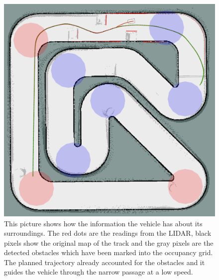 \begin{figure}
	\centering
	\includegraphics[width=\textwidth]{../img/experiments/simulator/obstacles-rviz.png}
	\caption{This picture shows how the information the vehicle has about its surroundings. The red dots are the readings from the LIDAR, black pixels show the original map of the track and the gray pixels are the detected obstacles which have been marked into the occupancy grid. The planned trajectory already accounted for the obstacles and it guides the vehicle through the narrow passage at a low speed.}
	\label{fig:obstacle-avoidance-rviz}
\end{figure}


